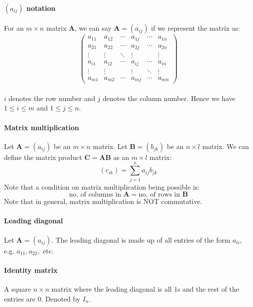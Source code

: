 \documentclass{scrartcl}
\renewcommand{\vec}[1]{\mathbf{#1}}
\begin{document}
\paragraph{$ (a_{ij}) $ notation}
For an $ m \times n $ matrix $ \vec{A} $, we can say $ \vec{A} = (a_{ij}) $ if we represent the matrix as:
\begin{equation}
\begin{pmatrix}
a_{11} & a_{12} & \cdots & a_{1j} & \cdots & a_{1n} \\
a_{21} & a_{22} & \cdots & a_{2j} & \cdots & a_{2n} \\
\vdots & \vdots & \ddots & \vdots &        & \vdots \\
a_{i1} & a_{i2} & \cdots & a_{ij} & \cdots & a_{in} \\
\vdots & \vdots &        & \vdots & \ddots & \vdots \\
a_{m1} & a_{m2} & \cdots & a_{mj} & \cdots & a_{mn}
\end{pmatrix}
\end{equation}
\\
$ i $ denotes the row number and $ j $ denotes the column number. Hence we have $ 1 \leq i \leq m $ and $ 1 \leq j \leq n $.

\paragraph{Matrix multiplication}
Let $ \vec{A} = (a_{ij}) $ be an $ m \times n $ matrix. Let $ \vec{B} = (b_{jk}) $ be an $ n \times l $ matrix. We can define the matrix product $ \vec{C = AB} $ as an $ m \times l $ matrix:
\begin{equation}
(c_{ik}) = \sum_{j=1}^{n} a_{ij} b_{jk}
\end{equation}
Note that a condition on matrix multiplication being possible is:
\begin{equation}
\textrm{no. of columns in } \vec{A} = \textrm{no. of rows in } \vec{B}
\end{equation}
Note that in general, matrix multiplication is NOT commutative.

\paragraph{Leading diagonal}
Let $ \vec{A} = (a_{ij}) $. The leading diagonal is made up of all entries of the form $ a_{ii} $, e.g. $ a_{11}, a_{22}, $ etc.

\paragraph{Identity matrix}
A square $ n \times n $ matrix where the leading diagonal is all $ 1 $s and the rest of the entries are $ 0 $. Denoted by $ I_{n} $.
\end{document}
